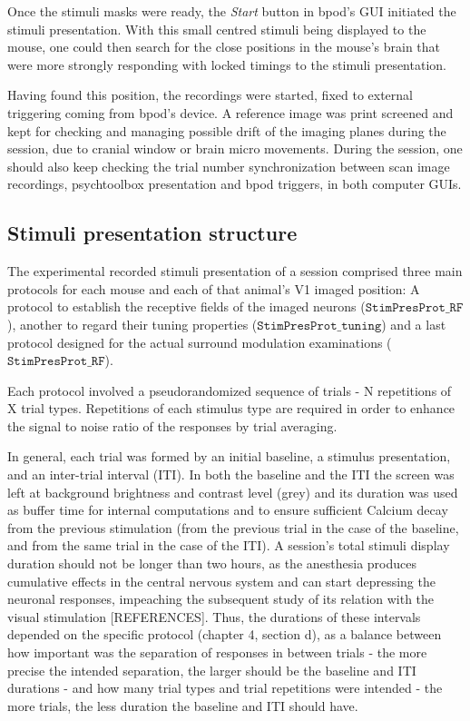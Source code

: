 Once the stimuli masks were ready, the \textit{Start} button in bpod's GUI initiated the stimuli presentation. With this small centred stimuli being displayed to the mouse, one could then search for the close positions in the mouse's brain that were more strongly responding with locked timings to the stimuli presentation. 

Having found this position, the recordings were started, fixed to external triggering coming from bpod's device. A reference image was print screened and kept for checking and managing possible drift of the imaging planes during the session, due to cranial window or brain micro movements. During the session, one should also keep checking the trial number synchronization between scan image recordings, psychtoolbox presentation and bpod triggers, in both computer GUIs.

\subsection{Stimuli presentation structure}

The experimental recorded stimuli presentation of a session comprised three main protocols for each mouse and each of that animal's V1 imaged position: A protocol to establish the receptive fields of the imaged neurons ($\texttt{StimPresProt\_RF}$), another to regard their tuning properties ($\texttt{StimPresProt\_tuning}$) and a last protocol designed for the actual surround modulation examinations ($\texttt{StimPresProt\_RF}$). 

Each protocol involved a pseudorandomized sequence of trials - N repetitions of X trial types. Repetitions of each stimulus type are required in order to enhance the signal to noise ratio of the responses by trial averaging. 

In general, each trial was formed by an initial baseline, a stimulus presentation, and an inter-trial interval (ITI). In both the baseline and the ITI the screen was left at background brightness and contrast level (grey) and its duration was used as buffer time for internal computations and to ensure sufficient Calcium decay from the previous stimulation (from the previous trial in the case of the baseline, and from the same trial in the case of the ITI). A session's total stimuli display duration should not be longer than two hours, as the anesthesia produces cumulative effects in the central nervous system and can start depressing the neuronal responses, impeaching the subsequent study of its relation with the visual stimulation [REFERENCES]. Thus, the durations of these intervals depended on the specific protocol (chapter 4, section d), as a balance between how important was the separation of responses in between trials - the more precise the intended separation, the larger should be the baseline and ITI durations - and how many trial types and trial repetitions were intended - the more trials, the less duration the baseline and ITI should have.

